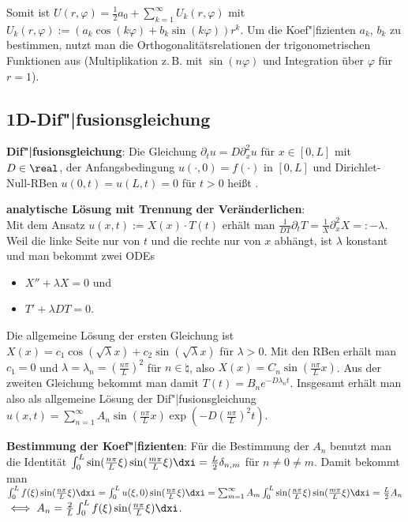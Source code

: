 Somit ist $U(r, \varphi) = \frac{1}{2} a_0 + \sum_{k=1}^\infty U_k(r, \varphi)$ mit
$U_k(r, \varphi) := (a_k \cos(k \varphi) + b_k \sin(k \varphi)) r^k$.
Um die Koef"|fizienten $a_k$, $b_k$ zu bestimmen, nutzt man die Orthogonalitätsrelationen
der trigonometrischen Funktionen aus
(Multiplikation z.\,B. mit $\sin(n\varphi)$ und Integration über $\varphi$ für $r = 1$).

\subsection{%
    1D-Dif"|fusionsgleichung%
}

\textbf{Dif"|fusionsgleichung}:
Die Gleichung $\partial_t u = D \partial_x^2 u$ für $x \in [0, L]$ mit $D \in \real$,
der Anfangsbedingung $u(\cdot, 0) = f(\cdot)$ in $[0, L]$ und
Dirichlet-Null-RBen $u(0, t) = u(L, t) = 0$ für $t > 0$ heißt .

\textbf{analytische Lösung mit Trennung der Veränderlichen}:\\
Mit dem Ansatz $u(x, t) := X(x) \cdot T(t)$ erhält man
$\frac{1}{DT} \partial_t T = \frac{1}{X} \partial_x^2 X =: -\lambda$.
Weil die linke Seite nur von $t$ und die rechte nur von $x$ abhängt, ist $\lambda$ konstant und
man bekommt zwei ODEs
\begin{itemize}
    \item
    $X'' + \lambda X = 0$ und
    
    \item
    $T' + \lambda DT = 0$.
\end{itemize}
Die allgemeine Lösung der ersten Gleichung ist
$X(x) = c_1 \cos(\sqrt{\lambda} x) + c_2 \sin(\sqrt{\lambda} x)$ für $\lambda > 0$.
Mit den RBen erhält man $c_1 = 0$ und $\lambda = \lambda_n = (\frac{n \pi}{L})^2$ für
$n \in \natural$, also $X(x) = C_n \sin(\frac{n \pi}{L} x)$.
Aus der zweiten Gleichung bekommt man damit $T(t) = B_n e^{-D \lambda_n t}$.
Insgesamt erhält man also als allgemeine Lösung der Dif"|fusionsgleichung
$u(x, t) = \sum_{n=1}^\infty A_n \sin(\frac{n \pi}{L} x) \exp(-D (\frac{n \pi}{L})^2 t)$.

\textbf{Bestimmung der Koef"|fizienten}:
Für die Bestimmung der $A_n$ benutzt man die Identität
$\int_0^L \sin(\frac{n \pi}{L} \xi) \sin(\frac{m \pi}{L} \xi) \dxi = \frac{L}{2} \delta_{n,m}$
für $n \not= 0 \not= m$.
Damit bekommt man\\
$\int_0^L f(\xi) \sin(\frac{n \pi}{L} \xi) \dxi
= \int_0^L u(\xi, 0) \sin(\frac{n \pi}{L} \xi) \dxi
= \sum_{m=1}^\infty A_m \int_0^L \sin(\frac{n \pi}{L} \xi) \sin(\frac{m \pi}{L} \xi) \dxi
= \frac{L}{2} A_n$\\
$\iff A_n = \frac{2}{L} \int_0^L f(\xi) \sin(\frac{n \pi}{L} \xi) \dxi$.

